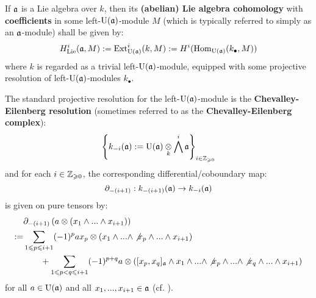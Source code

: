         \begin{definition} \label{def: lie_algebra_cohomology}
            If $\mathfrak{a}$ is a Lie algebra over $k$, then its \textbf{(abelian) Lie algebra cohomology} with \textbf{coefficients} in some left-$\mathrm{U}(\mathfrak{a})$-module $M$ (which is typically referred to simply as an $\mathfrak{a}$-module) shall be given by:
                $$H^i_{\mathrm{Lie}}(\mathfrak{a}, M) := \mathrm{Ext}^i_{\mathrm{U}(\mathfrak{a})}(k, M) := H^i( \mathrm{Hom}_{\mathrm{U}(\mathfrak{a})}(k_{\bullet}, M) )$$
            where $k$ is regarded as a trivial left-$\mathrm{U}(\mathfrak{a})$-module, equipped with some projective resolution of left-$\mathrm{U}(\mathfrak{a})$-modules $k_{\bullet}$.

            The standard projective resolution for the left-$\mathrm{U}(\mathfrak{a})$-module is the \textbf{Chevalley-Eilenberg resolution} (sometimes referred to as the \textbf{Chevalley-Eilenberg complex}):
                $$\left\{ k_{-i}(\a) := \rmU(\a) \tensor_k \bigwedge^i \a \right\}_{i \in \Z_{\geq 0}}$$
            and for each $i \in \mathbb{Z}_{\geqslant 0}$, the corresponding differential/coboundary map:
                $$\partial_{-(i + 1)}: k_{-(i + 1)}(\mathfrak{a}) \to k_{-i}(\mathfrak{a})$$
            is given on pure tensors by:
                $$
                    \begin{aligned}
                        & \del_{-(i + 1)}\left( a \tensor (x_1 \wedge ... \wedge x_{i + 1}) \right)
                        \\
                        := &
                            \sum_{1 \leq p \leq i + 1} (-1)^p a x_p \tensor (x_1 \wedge ... \wedge \not{x_p} \wedge ... \wedge x_{i + 1})
                            \\
                            & \qquad + \sum_{1 \leq p < q \leq i + 1} (-1)^{p + q} a \tensor ( [x_p, x_q]_{\a} \wedge x_1 \wedge ... \wedge \not{x_p} \wedge ... \wedge \not{x_q} \wedge ... \wedge x_{i + 1})
                    \end{aligned}
                $$
            for all $a \in \mathrm{U}(\mathfrak{a})$ and all $x_1, ..., x_{i + 1} \in \mathfrak{a}$ (cf. \cite[Section VII.4]{hilton_stammbach_homological_algebra}).
        \end{definition}
